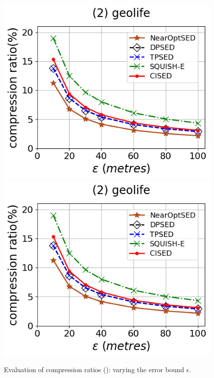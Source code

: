 \begin{figure}[tb!]
	\includegraphics[scale=0.315]{Figures/Exp-CR-epsilon-geolife.png}	\hspace{1ex}
	\includegraphics[scale=0.315]{Figures/Exp-CR-epsilon-geolife.png}
	\vspace{-2.5ex}
	\caption{\small Evaluation of compression ratios (\sed): varying the error bound $\epsilon$.}
	\label{fig:cr-sed}
	\vspace{-.5ex}
\end{figure}


